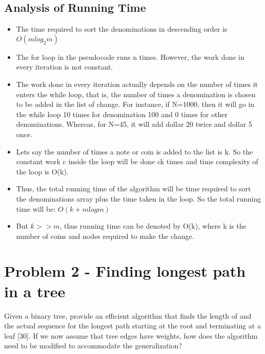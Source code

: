 \documentclass[12pt]{article}
\begin{document}
\subsection{Analysis of Running Time}
\begin{itemize}
    \item The time required to sort the denominations in descending order is $O(mlog_2m)$
    \item The for loop in the pseudocode runs n times. However, the work done in every iteration is not constant.
    \item The work done in every iteration actually depends on the number of times it enters the while loop, that is, the number of times a denomination is chosen to be added in the list of change. For instance, if N=1000, then it will go in the while loop 10 times for denomination 100 and 0 times for other denominations. Whereas, for N=45, it will add dollar 20 twice and dollar 5 once. 
    \item Lets say the number of times a note or coin is added to the list is k. So the constant work c inside the loop will be done ck times and time complexity of the loop is O(k).
    \item Thus, the total running time of the algorithm will be time required to sort the denominations array plus the time taken in the loop. So the total running time will be:
    $O(k + m log m)$
    \item But $k >> m$, thus running time can be denoted by O(k), where k is the number of coins and nodes required to make the change. 
    
\end{itemize}
\section{Problem 2 - Finding longest path in a tree}
Given a binary tree, provide an efficient algorithm that finds the length of and the actual sequence for the longest path starting at the root and terminating at a leaf [30]. If we now assume that tree edges have weights, how does the algorithm need to be modified to accommodate the generalization? 
\end{document}
